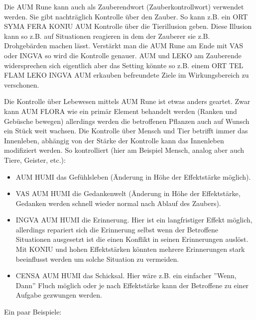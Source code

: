 \documentclass{article}
\begin{document}
Die AUM Rune kann auch als Zauberendwort (Zauberkontrollwort) verwendet werden. Sie gibt nachträglich Kontrolle über
den Zauber. So kann z.B. ein ORT SYMA FERA KONIU AUM Kontrolle über die Tierillusion geben. Diese Illusion kann so z.B.
auf Situationen reagieren in dem der Zauberer sie z.B. Drohgebärden machen lässt. Verstärkt man die AUM Rune am Ende
mit VAS oder INGVA so wird die Kontrolle genauer. AUM und LEKO am Zauberende widersprechen sich eigentlich aber das
Setting könnte so z.B. einem ORT TEL FLAM LEKO INGVA AUM erkauben befreundete Ziele im Wirkungsbereich zu verschonen.

Die Kontrolle über Lebewesen mittels AUM Rune ist etwas anders geartet. Zwar kann AUM FLORA wie ein primär Element
behandelt werden (Ranken und Gebüsche bewegen) allerdings werden die betroffenen Pflanzen auch auf Wunsch ein Stück weit
wachsen. Die Kontrolle über Mensch und Tier betrifft immer das Innenleben, abhängig von der Stärke der Kontrolle kann
das Innenleben modifiziert werden. So kontrolliert (hier am Beispiel Mensch, analog aber auch Tiere, Geister, etc.):

\begin{itemize}
\item AUM HUMI das Gefühlsleben (Änderung in Höhe der Effektstärke möglich).
\item VAS AUM HUMI die Gedankenwelt (Änderung in Höhe der Effektstärke, Gedanken werden schnell wieder normal nach Ablauf des Zaubers).
\item INGVA AUM HUMI die Erinnerung. Hier ist ein langfristiger Effekt möglich, allerdings repariert sich die Erinnerung selbst wenn der Betroffene Situationen ausgesetzt ist die einen Konflikt in seinen Erinnerungen auslöst. Mit KONIU und hohen Effektstärken könnten mehrere Erinnerungen stark beeinflusst werden um solche Situation zu vermeiden.
\item CENSA AUM HUMI das Schicksal. Hier wäre z.B. ein einfacher ''Wenn, Dann'' Fluch möglich oder je nach Effektstärke kann der Betroffene zu einer Aufgabe gezwungen werden.
\end{itemize}

Ein paar Beispiele:
\end{document}
